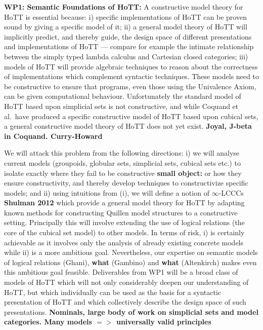\documentclass[a4paper,11pt]{article}
\begin{document}
{\bf WP1: Semantic Foundations of HoTT:} 
A constructive model theory for HoTT is essential because: i)
specific implementations of HoTT can be proven sound by giving a specific
model of it; ii) 
a general model theory of HoTT will implicitly predict, and thereby
guide, the design space of different presentations and implementations
of HoTT --- compare for example the intimate relationship between the
simply typed lambda calculus and Cartesian closed categories; iii)
models of HoTT will provide algebraic techniques to reason about the
correctness of implementations which complement syntactic
techniques. These models need to be constructive to ensure that
programs, even those using the Univalence Axiom, can be given
computational behaviour. Unfortunately the standard model of HoTT
based upon simplicial sets is not constructive, and while Coquand et
al.\ have produced a specific constructive model of HoTT based upon
cubical sets, a general constructive model theory of HoTT does not yet
exist. {\bf Joyal, J-beta in Coquand. Curry-Howard}

We will attack this problem from the following directions: i) we will
analyse current models (groupoids, globular sets, simplicial sets,
cubical sets etc.) to isolate exactly where they fail to be
constructive {\bf small object:} or how they ensure constructivity,
and thereby develop techniques to constructivize specific models; and
ii) using intuitions from (i), we will define a notion of
$\infty$-LCCCs {\bf Shulman 2012} which provide a general model theory for HoTT 
by adapting known methods for
constructing Quillen model structures to a constructive setting.  
Principally this will involve extending the use of logical relations
(the core of the cubical set model) to other models.  In terms of
risk, i) is certainly achievable as it involves only the analysis of
already existing concrete models while ii) is a more ambitious
goal. Nevertheless, our expertise on semantic models of logical
relations (Ghani), {\bf what} (Gambino) and {\bf what} (Altenkirch)
makes even this ambitious goal feasible. Deliverables from WP1 will be
a broad class of models of HoTT which will not only considerably
deepen our understanding of HoTT, but which individually can be used
as the basis for a syntactic presentation of HoTT and which
collectively describe the design space of such presentations.  {\bf
  Nominals, large body of work on simplicial sets and model
  categories. Many models $=>$ universally valid principles}
\end{document}
